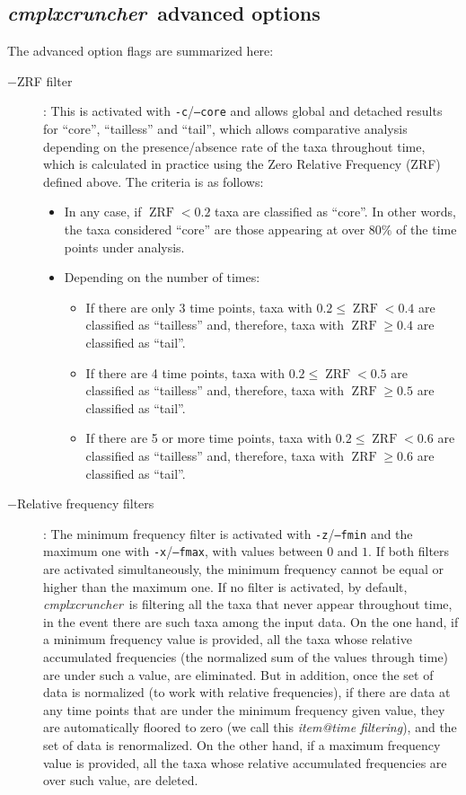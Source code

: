 \documentclass[12pt]{article}
\newcommand{\CC}[0]{\emph{cmplxcruncher}}
\begin{document}
\subsection{\CC\ advanced options}
The advanced option flags are summarized here:
\begin{description}
	\item[$-$ZRF filter]: This is activated with \texttt{-c}/\texttt{--core} and allows global and detached results for ``core'', ``tailless'' and ``tail'', which allows comparative analysis depending on the presence/absence rate of the taxa throughout time, which is calculated in practice using the Zero Relative Frequency (ZRF) defined above. The criteria is as follows: 
	\begin{itemize}
		\item In any case, if $\operatorname{ZRF} < 0.2$ taxa are classified as ``core''. In other words, the taxa considered ``core'' are those appearing at over $80\%$ of the time points under analysis.
		\item Depending on the number of times:
		\begin{itemize}
			\item If there are only 3 time points, taxa with $0.2 \le\operatorname{ZRF} < 0.4$ are classified as ``tailless'' and, therefore, taxa with $\operatorname{ZRF} \ge 0.4$ are classified as ``tail''.
			\item If there are 4 time points, taxa with $0.2 \le\operatorname{ZRF} < 0.5$ are classified as ``tailless'' and, therefore, taxa with $\operatorname{ZRF} \ge 0.5$ are classified as ``tail''.
			\item If there are 5 or more time points, taxa with $0.2 \le\operatorname{ZRF} < 0.6$ are classified as ``tailless'' and, therefore, taxa with $\operatorname{ZRF} \ge 0.6$ are classified as ``tail''.			      
		\end{itemize}
    \end{itemize}
	\item[$-$Relative frequency filters]: The minimum frequency filter is activated with \texttt{-z}/\texttt{--fmin} and the maximum one with \texttt{-x}/\texttt{--fmax}, with values between $0$ and $1$. If both filters are activated simultaneously, the minimum frequency cannot be equal or higher than the maximum one. If no filter is activated, by default, \CC\ is filtering all the taxa that never appear throughout time, in the event there are such taxa among the input data. On the one hand, if a minimum frequency value is provided, all the taxa whose relative accumulated frequencies (the normalized sum of the values through time) are under such a value, are eliminated. But in addition, once the set of data is normalized (to work with relative frequencies), if there are data at any time points that are under the minimum frequency given value, they are automatically floored to zero (we call this \emph{item@time filtering}), and the set of data is renormalized. On the other hand, if a maximum frequency value is provided, all the taxa whose relative accumulated frequencies are over such value, are deleted. 
\end{description}
\end{document}
